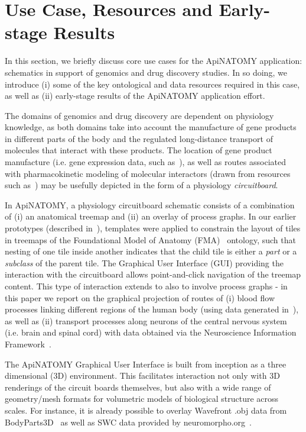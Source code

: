 \section{Use Case, Resources and Early-stage Results} \label{sect:motivation}            %

In this section, we briefly discuss core use cases for the ApiNATOMY application: schematics in support of genomics and drug discovery studies. In so doing, we introduce (i) some of the key ontological and data resources required in this case, as well as (ii) early-stage results of the ApiNATOMY application effort.

The domains of genomics and drug discovery are dependent on physiology knowledge, as both domains take into account the manufacture of gene products in different parts of the body and the regulated long-distance transport of molecules that interact with these products. The location of gene product manufacture (i.e. gene expression data, such as~\cite{EBI}), as well as routes associated with pharmacokinetic modeling of molecular interactors (drawn from resources such as~\cite{HMC+13}) may be usefully depicted in the form of a physiology \emph{circuitboard}.

In ApiNATOMY, a physiology circuitboard schematic consists of a combination of (i) an anatomical treemap and (ii) an overlay of process graphs. In our earlier prototypes (described in~\cite{BGS12,KBK14}), templates were applied to constrain the layout of tiles in treemaps of the Foundational Model of Anatomy (FMA)~\cite{RM03} ontology, such that nesting of one tile inside another indicates that the child tile is either a \emph{part} or a \emph{subclass} of the parent tile. The Graphical User Interface (GUI) providing the interaction with the circuitboard allows point-and-click navigation of the treemap content. This type of interaction extends to also to involve process graphs - in this paper we report on the graphical projection of routes of (i) blood flow processes linking different regions of the human body (using data generated in~\cite{deB11}), as well as (ii) transport processes along neurons of the central nervous system (i.e. brain and spinal cord) with data obtained via the Neuroscience Information Framework~\cite{Gar+08}.

The ApiNATOMY Graphical User Interface is built from inception as a three dimensional (3D) environment. This facilitates interaction not only with 3D renderings of the circuit boards themselves, but also with a wide range of geometry/mesh formats for volumetric models of biological structure across scales. For instance, it is already possible to overlay Wavefront .obj data from BodyParts3D~\cite{MFT+09} as well as SWC data provided by neuromorpho.org~\cite{Asc06}.


